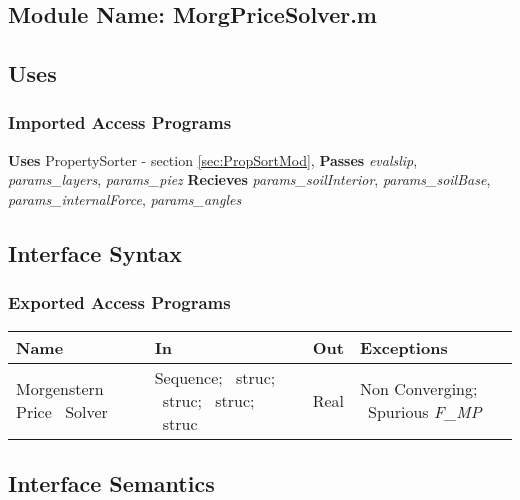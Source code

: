\documentclass[12pt, titlepage]{article}
\begin{document}
\subsection{Module Name: MorgPriceSolver.m}

\subsection{Uses}

\subsubsection{Imported Access Programs}

\noindent
\textbf{Uses} PropertySorter - section \ref{sec:PropSortMod},
\textbf{Passes} \textit{evalslip}, \textit{params\_layers},
\textit{params\_piez} \textbf{Recieves} \textit{params\_soilInterior},
\textit{params\_soilBase}, \textit{params\_internalForce},
\textit{params\_angles}

\subsection{Interface Syntax}

\subsubsection{Exported Access Programs}
\begin{center}
\renewcommand*{\arraystretch}{1.5}
\begin{tabular}{| p{} | p{} | 
p{} | p{} |} \hline 

  \textbf{Name} & \textbf{In} & \textbf{Out} & \textbf{Exceptions}
  \\ \hline

  Morgenstern Price ~\newline Solver & Sequence; ~\newline struc;
  ~\newline struc; ~\newline struc; ~\newline struc & Real & Non
  Converging; ~\newline Spurious \textit{F\_MP} \\ \hline
\end{tabular}
\end{center}

\subsection{Interface Semantics}
\end{document}

